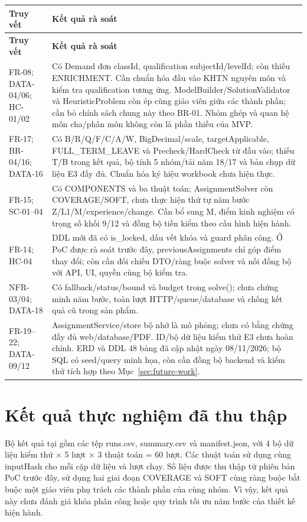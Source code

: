 \documentclass[12pt,a4paper]{report}
\newcommand{\code}[1]{\texttt{\detokenize{#1}}}
\begin{document}
\begin{longtable}{|p{3.7cm}|p{10.2cm}|}
\hline
\textbf{Truy vết} & \textbf{Kết quả rà soát} \\\hline
\endfirsthead
\hline
\textbf{Truy vết} & \textbf{Kết quả rà soát} \\\hline
\endhead
FR-08; DATA-04/06; HC-01/02 & Có Demand đơn classId, qualification subjectId/levelId; còn thiếu ENRICHMENT. Cần chuẩn hóa đầu vào KHTN nguyên môn và kiểm tra qualification tương ứng. ModelBuilder/SolutionValidator và HeuristicProblem còn ép cùng giáo viên giữa các thành phần; cần bỏ chính sách chung này theo BR-01. Nhóm ghép và quan hệ môn cha/phân môn không còn là phần thiếu của MVP. \\\hline
FR-17; BR-04/16; DATA-16 & Có B/R/Q/F/C/A/W, BigDecimal/scale, targetApplicable, FULL\_TERM\_LEAVE và Precheck/HardCheck từ đầu vào; thiếu T/B trong kết quả, bộ tính 5 nhóm/tải năm 18/17 và bản chụp dữ liệu E3 đầy đủ. Chuẩn hóa ký hiệu workbook chưa hiện thực. \\\hline
FR-15; SC-01--04 & Có COMPONENTS và ba thuật toán; AssignmentSolver còn COVERAGE/SOFT, chưa thực hiện thứ tự năm bước Z/L1/M/experience/change. Cần bổ sung M, điểm kinh nghiệm có trọng số khối 9/12 và đồng bộ tiền kiểm theo cấu hình hiện hành. \\\hline
FR-14; HC-04 & DDL mới đã có is\_locked, dấu vết khóa và guard phân công. Ở PoC được rà soát trước đây, previousAssignments chỉ góp điểm thay đổi; còn cần đối chiếu DTO/ràng buộc solver và nối đồng bộ với API, UI, quyền cùng bộ kiểm tra. \\\hline
NFR-03/04; DATA-18 & Có fallback/status/bound và budget trong solve(); chưa chứng minh năm bước, toàn lượt HTTP/queue/database và chống kết quả cũ trong sản phẩm. \\\hline
FR-19--22; DATA-09/12 & AssignmentService/store bộ nhớ là mô phỏng; chưa có bằng chứng đầy đủ web/database/PDF. ID/bộ dữ liệu kiểm thử E3 chưa hoàn chỉnh. ERD và DDL 48 bảng đã cập nhật ngày 08/11/2026; bộ SQL có seed/query minh họa, còn cần đồng bộ backend và kiểm thử tích hợp theo Mục~\ref{sec:future-work}. \\\hline
\end{longtable}


\section{Kết quả thực nghiệm đã thu thập}\label{sec:historical-results}
Bộ kết quả tại \code{tass-comparison/results/verified-comparison/} gồm các tệp runs.csv, summary.csv và manifest.json, với 4 bộ dữ liệu kiểm thử $\times$ 5 lượt $\times$ 3 thuật toán = 60 lượt. Các thuật toán sử dụng cùng inputHash cho mỗi cặp dữ liệu và lượt chạy. Số liệu được thu thập từ phiên bản PoC trước đây, sử dụng hai giai đoạn COVERAGE và SOFT cùng ràng buộc bắt buộc một giáo viên phụ trách các thành phần của cùng nhóm. Vì vậy, kết quả này chưa đánh giá khóa phân công hoặc quy trình tối ưu năm bước của thiết kế hiện hành.
\end{document}
